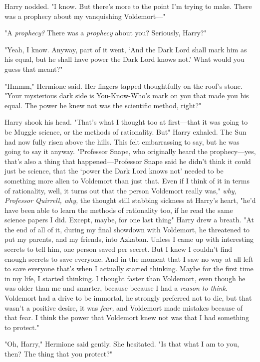 Harry nodded. "I know. But there's more to the point I'm trying to make. There
was a prophecy about my vanquishing Voldemort—"

"A \emph{prophecy?} There was a \emph{prophecy} about you? Seriously, Harry?"

"Yeah, I know. Anyway, part of it went, `And the Dark Lord shall mark him as
his equal, but he shall have power the Dark Lord knows not.' What would you
guess that meant?"

"Hmmm," Hermione said. Her fingers tapped thoughtfully on the roof's stone.
"Your mysterious dark side is You-Know-Who's mark on you that made you his
equal. The power he knew not{\el} was the scientific method, right?"

Harry shook his head. "That's what I thought too at first—that it was going
to be Muggle science, or the methods of rationality. But{\el}" Harry
exhaled. The Sun had now fully risen above the hills. This felt embarrassing to
say, but he was going to say it anyway. "Professor Snape, who originally heard
the prophecy—yes, that's also a thing that happened—Professor Snape said he
didn't think it could just be science, that the `power the Dark Lord knows not'
needed to be something more alien to Voldemort than just that. Even if I think
of it in terms of rationality, well, it turns out that the person Voldemort
really was," \emph{why, Professor Quirrell, why,} the thought still stabbing
sickness at Harry's heart, "he'd have been able to learn the methods of
rationality too, if he read the same science papers I did. Except, maybe, for
one last thing{\el}" Harry drew a breath. "At the end of all of it, during
my final showdown with Voldemort, he threatened to put my parents, and my
friends, into Azkaban. Unless I came up with interesting secrets to tell him,
one person saved per secret. But I knew I couldn't find enough secrets to save
everyone. And in the moment that I saw no way at all left to save
everyone{\el} that's when I actually started thinking. Maybe for the first
time in my life, I started thinking. I thought faster than Voldemort, even
though he was older than me and smarter, because{\el} because I had a
\emph{reason to think}. Voldemort had a drive to be immortal, he strongly
preferred not to die, but that wasn't a positive desire, it was \emph{fear,}
and Voldemort made mistakes because of that fear. I think the power that
Voldemort knew not{\el} was that I had something to protect."

"Oh, Harry," Hermione said gently. She hesitated. "Is that what I am to you,
then? The thing that you protect?"

